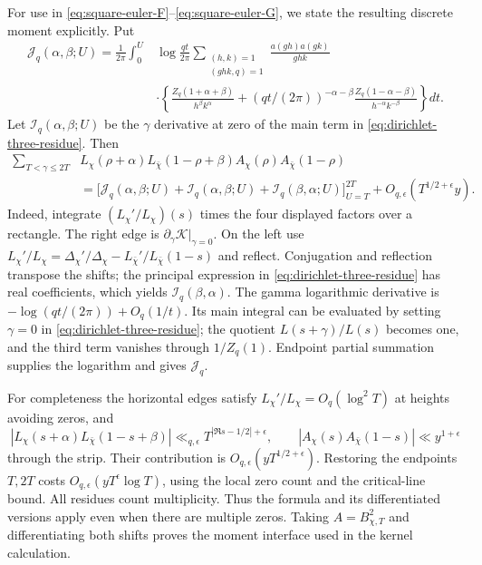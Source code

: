 For use in \eqref{eq:square-euler-F}--\eqref{eq:square-euler-G}, we
state the resulting discrete moment explicitly. Put
\begin{align*}
 \mathcal J_q(\alpha,\beta;U)
 =\frac1{2\pi}\int_0^U&\log\frac{qt}{2\pi}
 \sum_{\substack{(h,k)=1\\(ghk,q)=1}}\frac{a(gh)a(gk)}{ghk}\\
 &\cdot\left\{\frac{Z_q(1+\alpha+\beta)}{h^\beta k^\alpha}
 +(qt/(2\pi))^{-\alpha-\beta}
              \frac{Z_q(1-\alpha-\beta)}{h^{-\alpha}k^{-\beta}}\right\}dt.
\end{align*}
Let $\mathcal I_q(\alpha,\beta;U)$ be the $\gamma$ derivative at zero
of the main term in \eqref{eq:dirichlet-three-residue}. Then
\begin{align}\label{eq:dirichlet-discrete}
 \sum_{T<\gamma\le2T}&L_\chi(\rho+\alpha)
 L_{\bar\chi}(1-\rho+\beta)A_\chi(\rho)A_{\bar\chi}(1-\rho)\nonumber\\
 &=\bigl[\mathcal J_q(\alpha,\beta;U)+\mathcal I_q(\alpha,\beta;U)
        +\mathcal I_q(\beta,\alpha;U)\bigr]_{U=T}^{2T}
       +O_{q,\epsilon}(T^{1/2+\epsilon}y).
\end{align}
Indeed, integrate $(L_\chi'/L_\chi)(s)$ times the four displayed
factors over a rectangle. The right edge is
$\partial_\gamma\mathcal K|_{\gamma=0}$.
On the left use $L_\chi'/L_\chi=\Delta_\chi'/\Delta_\chi-
L_{\bar\chi}'/L_{\bar\chi}(1-s)$ and reflect. Conjugation and
reflection transpose the shifts; the principal expression in
\eqref{eq:dirichlet-three-residue} has real coefficients, which yields
$\mathcal I_q(\beta,\alpha)$. The gamma logarithmic derivative is
$-\log(qt/(2\pi))+O_q(1/t)$. Its main integral can be evaluated by
setting $\gamma=0$ in \eqref{eq:dirichlet-three-residue}; the quotient
$L(s+\gamma)/L(s)$ becomes one, and the third term vanishes through
$1/Z_q(1)$. Endpoint partial summation supplies the logarithm and gives
$\mathcal J_q$.

For completeness the horizontal edges satisfy
$L_\chi'/L_\chi=O_q(\log^2T)$ at heights avoiding zeros, and
\[
 |L_\chi(s+\alpha)L_{\bar\chi}(1-s+\beta)|
       \ll_{q,\epsilon}T^{|\Re s-1/2|+\epsilon},\qquad
 |A_\chi(s)A_{\bar\chi}(1-s)|\ll y^{1+\epsilon}
\]
through the strip. Their contribution is
$O_{q,\epsilon}(yT^{1/2+\epsilon})$.
Restoring the endpoints $T,2T$ costs
$O_{q,\epsilon}(yT^\epsilon\log T)$, using the local zero count and
the critical-line bound. All residues count multiplicity. Thus the
formula and its differentiated versions apply even when there are
multiple zeros. Taking $A=B_{\chi,T}^2$ and differentiating both
shifts proves the moment interface used in the kernel calculation.

